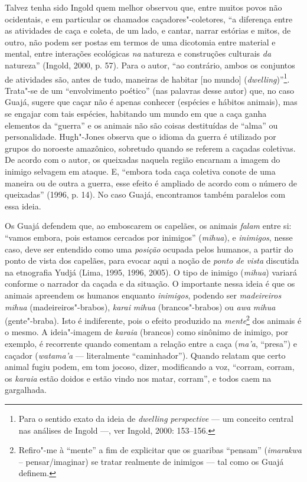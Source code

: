 Talvez tenha sido Ingold quem melhor observou que, entre muitos povos
não ocidentais, e em particular os chamados caçadores"-coletores, ``a
diferença entre as atividades de caça e coleta, de um lado, e cantar,
narrar estórias e mitos, de outro, não podem ser postas em termos de uma
dicotomia entre material e mental, entre interações ecológicas \emph{na}
natureza e construções culturais \emph{da} natureza'' (Ingold, 2000, p.
57). Para o autor, ``ao contrário, ambos os conjuntos de atividades são,
antes de tudo, maneiras de habitar {[}no mundo{]}
(\emph{dwelling})''\footnote{Para o sentido exato da ideia de
  \emph{dwelling} \emph{perspective} --- um conceito central nas análises
  de Ingold ---, ver Ingold, 2000: 153--156.}. Trata"-se de um
``envolvimento poético'' (nas palavras desse autor) que, no caso Guajá,
sugere que caçar não é apenas conhecer (espécies e hábitos animais), mas
se engajar com tais espécies, habitando um mundo em que a caça ganha
elementos da ``guerra'' e os animais não são coisas destituídas de
``alma'' ou personalidade. Hugh"-Jones observa que o idioma da guerra é
utilizado por grupos do noroeste amazônico, sobretudo quando se referem
a caçadas coletivas. De acordo com o autor, os queixadas naquela região
encarnam a imagem do inimigo selvagem em ataque. E, ``embora toda caça
coletiva conote de uma maneira ou de outra a guerra, esse efeito é
ampliado de acordo com o número de queixadas'' (1996, p. 14). No caso
Guajá, encontramos também paralelos com essa ideia.

Os Guajá defendem que, ao emboscarem os capelães, os animais
\emph{falam} entre si: ``vamos embora, pois estamos cercados por
inimigos'' (\emph{mihua}), e \emph{inimigos}, nesse caso, deve ser
entendido como uma \emph{posição} ocupada pelos humanos, a partir do
ponto de vista dos capelães, para evocar aqui a noção de \emph{ponto de
vista} discutida na etnografia Yudjá (Lima, 1995, 1996, 2005). O tipo de
inimigo (\emph{mihua}) variará conforme o narrador da caçada e da
situação. O importante nessa ideia é que os animais apreendem os humanos
enquanto \emph{inimigos}, podendo ser \emph{madeireiros mihua}
(madeireiros"-brabos), \emph{karai} \emph{mihua} (brancos"-brabos) ou
\emph{awa} \emph{mihua} (gente"-braba). Isto é indiferente, pois o efeito
produzido na \emph{mente}\footnote{Refiro"-me à ``mente'' a fim de
  explicitar que os guaribas ``pensam'' (\emph{imarakwa} --
  pensar/imaginar) se tratar realmente de inimigos --- tal como os Guajá
  definem.} dos animais é o mesmo. A ideia"-imagem de \emph{karaia}
(brancos) como sinônimo de inimigo, por exemplo, é recorrente quando
comentam a relação entre a caça (\emph{ma'a}, ``presa'') e caçador
(\emph{watama'a} --- literalmente ``caminhador''). Quando relatam que certo
animal fugiu podem, em tom jocoso, dizer, modificando a voz, ``corram,
corram, os \emph{karaia} estão doidos e estão vindo nos matar, corram'',
e todos caem na gargalhada.

